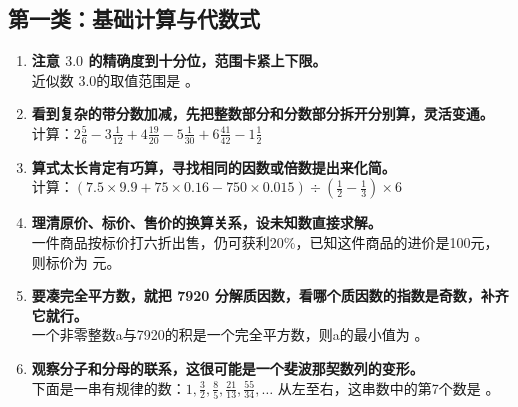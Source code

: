 \documentclass{ctexart}
\begin{document}
\subsection*{第一类：基础计算与代数式}
\begin{enumerate}
    \item \textbf{注意 $3.0$ 的精确度到十分位，范围卡紧上下限。} \\
    近似数 3.0的取值范围是 \underline{\hspace{2cm}}。
    \vspace{2cm}
    \vspace{2cm}
    
    \item \textbf{看到复杂的带分数加减，先把整数部分和分数部分拆开分别算，灵活变通。} \\
    计算：$2\frac{5}{6}-3\frac{1}{12}+4\frac{19}{20}-5\frac{1}{30}+6\frac{41}{42}-1\frac{1}{2}$
    \vspace{2cm}
    \vspace{2cm}
    
    \item \textbf{算式太长肯定有巧算，寻找相同的因数或倍数提出来化简。} \\
    计算：$(7.5\times9.9+75\times0.16-750\times0.015)\div\left(\frac{1}{2}-\frac{1}{3}\right)\times6$ 
    \vspace{2cm}
    \vspace{2cm}
    \item \textbf{理清原价、标价、售价的换算关系，设未知数直接求解。} \\
    一件商品按标价打六折出售，仍可获利20\%，已知这件商品的进价是100元，则标价为 \underline{\hspace{2cm}} 元。
    \vspace{2cm}
    \vspace{2cm}
    \item \textbf{要凑完全平方数，就把 7920 分解质因数，看哪个质因数的指数是奇数，补齐它就行。} \\
    一个非零整数a与7920的积是一个完全平方数，则a的最小值为 \underline{\hspace{2cm}}。
    \vspace{2cm}
    \vspace{2cm}
    \item \textbf{观察分子和分母的联系，这很可能是一个斐波那契数列的变形。} \\
    下面是一串有规律的数：$1, \frac{3}{2}, \frac{8}{5}, \frac{21}{13}, \frac{55}{34}, \dots$ 从左至右，这串数中的第7个数是 \underline{\hspace{2cm}}。
    \vspace{2cm}
    \vspace{2cm}
\end{enumerate}
\end{document}
